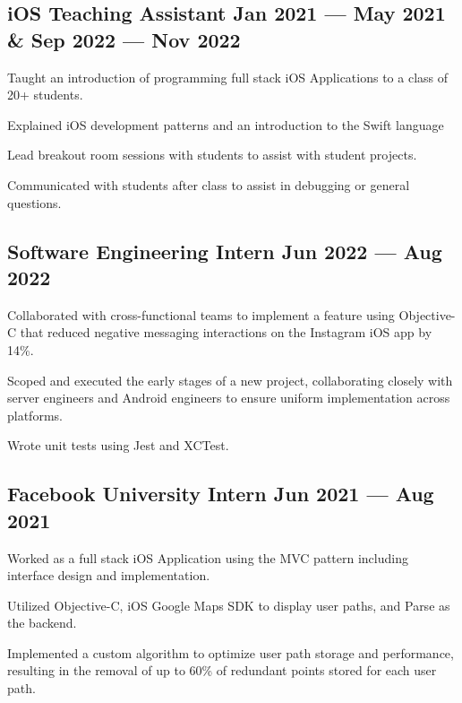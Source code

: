 
\subsection{{iOS Teaching Assistant \hfill Jan 2021 --- May 2021 \& Sep 2022 --- Nov 2022}}
\begin{zitemize}
\item Taught an introduction of programming full stack iOS Applications to a class of 20+ students.
\item Explained iOS development patterns and an introduction to the Swift language
\item Lead breakout room sessions with students to assist with student projects.
\item Communicated with students after class to assist in debugging or general questions.
\end{zitemize}


\subsection{{Software Engineering Intern \hfill Jun 2022 --- Aug 2022}}
\begin{zitemize}
\item Collaborated with cross-functional teams to implement a feature using Objective-C that reduced negative messaging interactions on the Instagram iOS app by 14\%.
\item Scoped and executed the early stages of a new project, collaborating closely with server engineers and Android engineers to ensure uniform implementation across platforms.
\item Wrote unit tests using Jest and XCTest.
\end{zitemize}

\subsection{{Facebook University Intern \hfill Jun 2021 --- Aug 2021}}
\begin{zitemize}
\item Worked as a full stack iOS Application using the MVC pattern including interface design and implementation.
\item Utilized Objective-C, iOS Google Maps SDK to display user paths, and Parse as the backend.
\item Implemented a custom algorithm to optimize user path storage and performance, resulting in the removal of up to 60\% of redundant points stored for each user path.
\end{zitemize}

